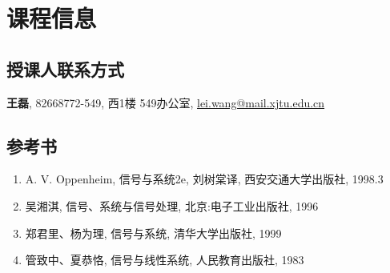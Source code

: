 \section*{课程信息}

    \subsection{授课人联系方式}

        \textbf{王磊}, 82668772-549, 西1楼 549办公室, \url{lei.wang@mail.xjtu.edu.cn}

    \subsection{参考书}

        \begin{enumerate}
            \item A. V. Oppenheim, 信号与系统2e, 刘树棠译, 西安交通大学出版社, 1998.3
            \item 吴湘淇, 信号、系统与信号处理, 北京:电子工业出版社, 1996
            \item 郑君里、杨为理, 信号与系统, 清华大学出版社, 1999
            \item 管致中、夏恭恪, 信号与线性系统, 人民教育出版社, 1983
        \end{enumerate}

